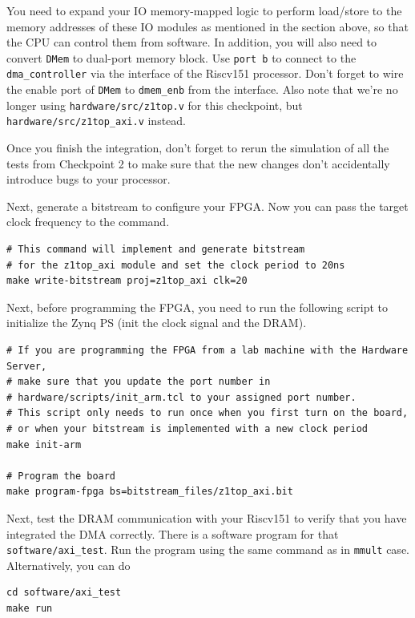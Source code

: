 \documentclass[11pt]{article}
\begin{document}
You need to expand your IO memory-mapped logic to perform load/store to the memory addresses of these IO modules as mentioned in the section above,
so that the CPU can control them from software. In addition, you will also need to convert \texttt{DMem} to dual-port memory block.
Use \texttt{port b} to connect to the \texttt{dma\_controller} via the interface of the Riscv151 processor.
Don't forget to wire the enable port of \texttt{DMem} to \texttt{dmem\_enb} from the interface.
Also note that we're no longer using \verb|hardware/src/z1top.v| for this checkpoint, but \verb|hardware/src/z1top_axi.v| instead.

Once you finish the integration, don't forget to rerun the simulation of all the tests from Checkpoint 2 to make sure that the new changes don't accidentally introduce bugs to your processor.

Next, generate a bitstream to configure your FPGA. Now you can pass the target clock frequency to the command.

\begin{verbatim}
# This command will implement and generate bitstream
# for the z1top_axi module and set the clock period to 20ns
make write-bitstream proj=z1top_axi clk=20
\end{verbatim}

Next, before programming the FPGA, you need to run the following script to initialize the Zynq PS (init the clock signal and the DRAM).

\begin{verbatim}
# If you are programming the FPGA from a lab machine with the Hardware Server,
# make sure that you update the port number in
# hardware/scripts/init_arm.tcl to your assigned port number.
# This script only needs to run once when you first turn on the board,
# or when your bitstream is implemented with a new clock period
make init-arm

# Program the board
make program-fpga bs=bitstream_files/z1top_axi.bit
\end{verbatim}

Next, test the DRAM communication with your Riscv151 to verify that you have integrated the DMA correctly. There is a software program for that \verb|software/axi_test|. Run the program using the same command as in \texttt{mmult} case. Alternatively, you can do

\begin{verbatim}
cd software/axi_test
make run
\end{verbatim}
\end{document}
